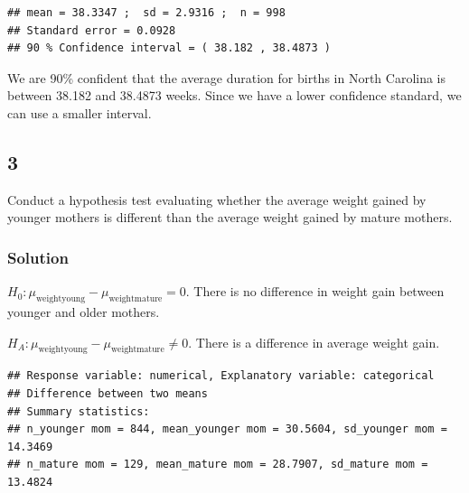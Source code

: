 \documentclass[]{article}
\newenvironment{Shaded}{\begin{snugshade}}{\end{snugshade}}
\newcommand{\KeywordTok}[1]{\textcolor[rgb]{0.13,0.29,0.53}{\textbf{#1}}}
\newcommand{\DataTypeTok}[1]{\textcolor[rgb]{0.13,0.29,0.53}{#1}}
\newcommand{\DecValTok}[1]{\textcolor[rgb]{0.00,0.00,0.81}{#1}}
\newcommand{\StringTok}[1]{\textcolor[rgb]{0.31,0.60,0.02}{#1}}
\newcommand{\OperatorTok}[1]{\textcolor[rgb]{0.81,0.36,0.00}{\textbf{#1}}}
\newcommand{\NormalTok}[1]{#1}
\begin{document}
\begin{verbatim}
## mean = 38.3347 ;  sd = 2.9316 ;  n = 998 
## Standard error = 0.0928 
## 90 % Confidence interval = ( 38.182 , 38.4873 )
\end{verbatim}

We are 90\% confident that the average duration for births in North
Carolina is between 38.182 and 38.4873 weeks. Since we have a lower
confidence standard, we can use a smaller interval.

\subsection{3}\label{section-2}

Conduct a hypothesis test evaluating whether the average weight gained
by younger mothers is different than the average weight gained by mature
mothers.

\subsubsection{Solution}\label{solution-7}

\(H_0: \mu_{\text{weightyoung}} - \mu_{\text{weightmature}} = 0\). There
is no difference in weight gain between younger and older mothers.

\(H_A: \mu_{\text{weightyoung}} - \mu_{\text{weightmature}} \neq 0\).
There is a difference in average weight gain.

\begin{Shaded}
\end{Shaded}

\begin{verbatim}
## Response variable: numerical, Explanatory variable: categorical
## Difference between two means
## Summary statistics:
## n_younger mom = 844, mean_younger mom = 30.5604, sd_younger mom = 14.3469
## n_mature mom = 129, mean_mature mom = 28.7907, sd_mature mom = 13.4824
\end{verbatim}
\end{document}
